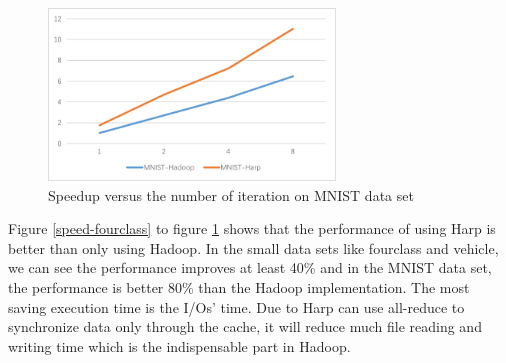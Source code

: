 \begin{figure}[htbp]
\centering
\includegraphics[width=3.0in]{image/speed-MNIST.png}
\caption{Speedup versus the number of iteration on MNIST data set}
\label{speed-MNIST}
\end{figure}

Figure \ref{speed-fourclass} to figure \ref{speed-MNIST} shows that the performance of using Harp is better than only using Hadoop. In the small data sets like fourclass and vehicle, we can see the performance improves at least 40\% and in the MNIST data set, the performance is better 80\% than the Hadoop implementation. The most saving execution time is the I/Os' time. Due to Harp can use all-reduce to synchronize data only through the cache, it will reduce much file reading and writing time which is the indispensable part in Hadoop.


